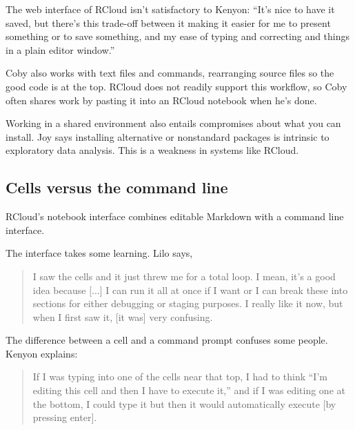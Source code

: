 The web interface of RCloud isn't satisfactory to Kenyon: ``It's nice to have
it saved, but there's this trade-off between it making it easier for me to
present something or to save something, and my ease of typing and
correcting and things in a plain editor window.''

Coby also works with text files and commands, rearranging source files
so the good code is at the top. RCloud does not readily support this
workflow, so Coby often shares work by pasting it into an RCloud
notebook when he's done.


Working in a shared environment also entails compromises about what you can
install. Joy says installing alternative or nonstandard packages is
intrinsic to exploratory data analysis. This is a weakness in systems
like RCloud.

\subsection{Cells versus the command line}
RCloud's notebook interface combines editable Markdown with a command line
interface.

The interface takes some learning. Lilo says,
\begin{quote}
I saw the cells and it just threw me
for a total loop. I mean, it's a good idea because [...] I can run it all at
once if I want or I can break these into sections for either debugging or
staging purposes. I really like it now, but when I first saw it, [it was] very
confusing.
\end{quote}

The difference between a cell and a command prompt confuses some people.
Kenyon explains:
\begin{quote}
If I was typing into one of the cells near that top, I had to think ``I'm editing
this cell and then I have to execute it,'' and if I was editing one at the bottom,
I could type it but then it would automatically execute [by pressing enter].
\end{quote}

